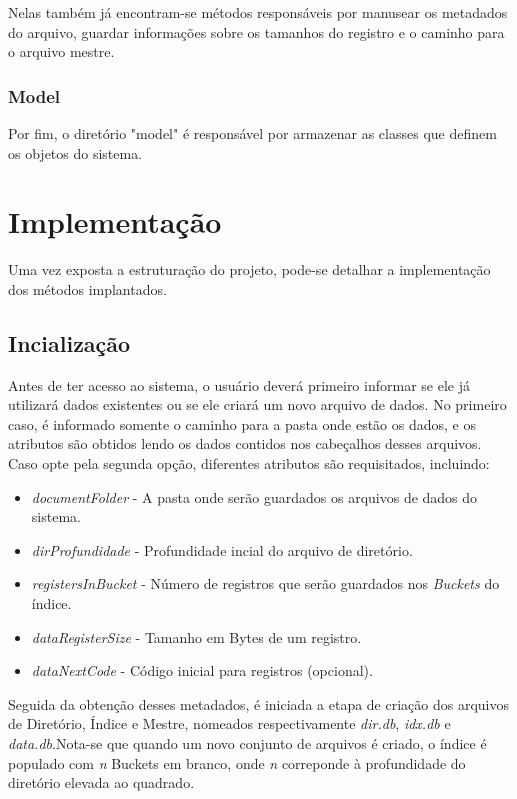 Nelas também já encontram-se métodos responsáveis por manusear os metadados do arquivo, guardar informações sobre os tamanhos do registro e o caminho para o arquivo mestre.

\subsubsection{\esp Model}

Por fim, o diretório "model" é responsável por armazenar as classes que definem os objetos do sistema.


\section{\esp Implementação}

Uma vez exposta a estruturação do projeto, pode-se detalhar a implementação dos métodos implantados.

\subsection{\esp Incialização}

Antes de ter acesso ao sistema, o usuário deverá primeiro informar se ele já utilizará dados existentes ou se ele criará um novo arquivo de dados. No primeiro caso, é informado somente o caminho para a pasta onde estão os dados, e os atributos são obtidos lendo os dados contidos nos cabeçalhos desses arquivos. Caso opte pela segunda opção, diferentes atributos são requisitados, incluindo:
\begin{itemize}
  \item \textit{documentFolder} - A pasta onde serão guardados os arquivos de dados do sistema.
  \item \textit{dirProfundidade} - Profundidade incial do arquivo de diretório. 
  \item \textit{registersInBucket} - Número de registros que serão guardados nos \textit{Buckets} do índice.
  \item \textit{dataRegisterSize} - Tamanho em Bytes de um registro.
   \item \textit{dataNextCode} - Código inicial para registros (opcional).
\end{itemize}

Seguida da obtenção desses metadados, é iniciada a etapa de criação dos arquivos de Diretório, Índice e Mestre, nomeados respectivamente \textit{dir.db}, \textit{idx.db} e \textit{data.db}.Nota-se que quando um novo conjunto de arquivos é criado, o índice é populado com \textit{n} Buckets em branco, onde \textit{n} correponde à profundidade do diretório elevada ao quadrado.


